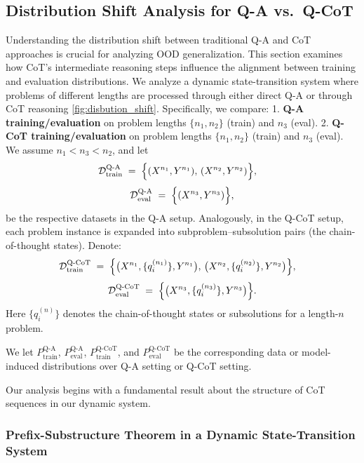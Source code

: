 \subsection{Distribution Shift Analysis for Q-A vs.\ Q-CoT}
Understanding the distribution shift between traditional Q-A and CoT approaches is crucial for analyzing OOD generalization. This section examines how CoT's intermediate reasoning steps influence the alignment between training and evaluation distributions.
We analyze a dynamic state-transition system where problems of different lengths are processed through either direct Q-A or through CoT reasoning \ref{fig:disbution_shift}. Specifically, we compare:
1. \textbf{Q-A training/evaluation} on problem lengths \(\{n_1, n_2\}\) (train) and \(n_3\) (eval).
2. \textbf{Q-CoT training/evaluation} on problem lengths \(\{n_1, n_2\}\) (train) and \(n_3\) (eval).
We assume \(n_{1} < n_{3} < n_{2}\), and let
\[
   \mathcal{D}_{\text{train}}^{\text{Q-A}} 
   \;=\;
   \Bigl\{
   (X^{n_1}, Y^{n_1}),\, 
   (X^{n_2}, Y^{n_2})
   \Bigr\}, 
   \quad \]
\[
   \mathcal{D}_{\text{eval}}^{\text{Q-A}}
   \;=\;
   \Bigl\{(X^{n_3}, Y^{n_3})\Bigr\},
\]
be the respective datasets in the Q-A setup.  Analogously, in the Q-CoT setup, each problem instance is expanded into subproblem–subsolution pairs (the chain-of-thought states).  Denote:
\[
   \mathcal{D}_{\text{train}}^{\text{Q-CoT}} 
   \;=\;
   \Bigl\{
   \bigl(X^{n_1}, \{q_i^{(n_1)}\}, Y^{n_1}\bigr),\, 
   \bigl(X^{n_2}, \{q_i^{(n_2)}\}, Y^{n_2}\bigr)
   \Bigr\},
   \quad \]
\[
   \mathcal{D}_{\text{eval}}^{\text{Q-CoT}}
   \;=\;
   \Bigl\{\bigl(X^{n_3}, \{q_i^{(n_3)}\}, Y^{n_3}\bigr)\Bigr\}.
\]
Here \(\{q_i^{(n)}\}\) denotes the chain-of-thought states or subsolutions for a length-\(n\) problem. 

We let \(P_{\text{train}}^{\text{Q-A}}\), \(P_{\text{eval}}^{\text{Q-A}}\), \(P_{\text{train}}^{\text{Q-CoT}}\), and \(P_{\text{eval}}^{\text{Q-CoT}}\) be the corresponding data or model-induced distributions over Q-A setting or Q-CoT setting.

Our analysis begins with a fundamental result about the structure of CoT sequences in our dynamic system.



\subsubsection{Prefix-Substructure Theorem in a Dynamic State-Transition System}

